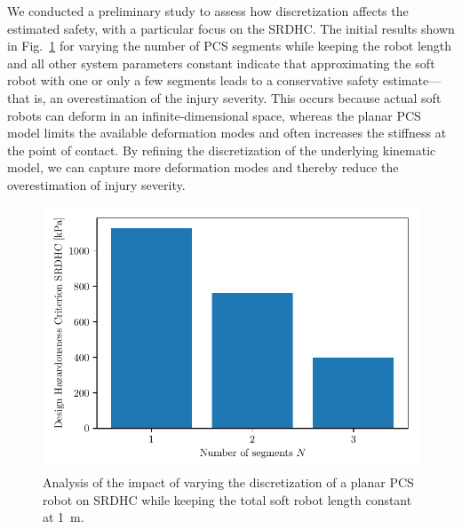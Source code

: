 We conducted a preliminary study to assess how discretization affects the estimated safety, with a particular focus on the \gls{SRDHC}. The initial results shown in Fig.~\ref{fig:safetymetric:planar_pcs_design_hazardousness_criterion_discretization} for varying the number of \gls{PCS} segments while keeping the robot length and all other system parameters constant indicate that approximating the soft robot with one or only a few segments leads to a conservative safety estimate—that is, an overestimation of the injury severity. This occurs because actual soft robots can deform in an infinite-dimensional space, whereas the planar \gls{PCS} model limits the available deformation modes and often increases the stiffness at the point of contact. By refining the discretization of the underlying kinematic model, we can capture more deformation modes and thereby reduce the overestimation of injury severity.

\begin{figure}
    \centering
    \includegraphics[width=0.5\linewidth]{safetymetric/figures/planar_pcs_design_hazardousness_criterion_discretization/design_hazardousness_criterion_bar.pdf}
    \caption{Analysis of the impact of varying the discretization of a planar \gls{PCS} robot on \gls{SRDHC} while keeping the total soft robot length constant at \SI{1}{m}.}
    \label{fig:safetymetric:planar_pcs_design_hazardousness_criterion_discretization}
\end{figure}